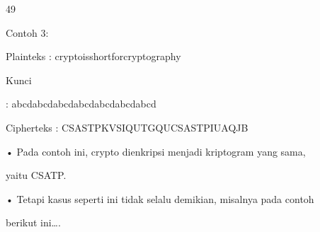 \documentclass{article}
\begin{document}

49

Contoh 3:

 Plainteks : cryptoisshortforcryptography

 Kunci 

: abcdabcdabcdabcdabcdabcdabcd

 Cipherteks : CSASTPKVSIQUTGQUCSASTPIUAQJB 

• Pada contoh ini, crypto dienkripsi menjadi kriptogram yang sama, 

yaitu CSATP. 

• Tetapi kasus seperti ini tidak selalu demikian, misalnya pada contoh 

berikut ini….
\end{document}
